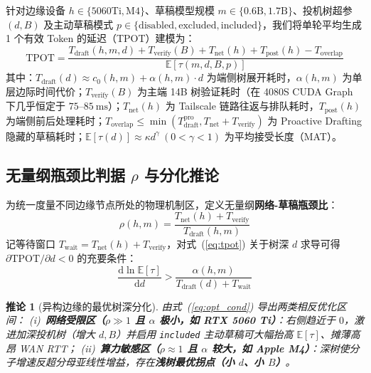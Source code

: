 \documentclass[conference]{IEEEtran}
\newtheorem{proposition}{推论}
\begin{document}
针对边缘设备 $h \in \{\text{5060Ti}, \text{M4}\}$、草稿模型规模 $m \in \{0.6\text{B}, 1.7\text{B}\}$、投机树超参 $(d, B)$ 及主动草稿模式 $p \in \{\text{disabled}, \text{excluded}, \text{included}\}$，我们将单轮平均生成 1 个有效 Token 的延迟（TPOT）建模为：
\begin{equation}
  \mathrm{TPOT} = \frac{T_{\text{draft}}(h,m,d) + T_{\text{verify}}(B) + T_{\text{net}}(h) + T_{\text{post}}(h) - T_{\text{overlap}}}{\mathbb{E}[\tau(m, d, B, p)]}
  \label{eq:tpot}
\end{equation}
其中：$T_{\text{draft}}(d) \approx c_0(h,m) + \alpha(h,m)\cdot d$ 为端侧树展开耗时，$\alpha(h,m)$ 为单层边际时间代价；$T_{\text{verify}}(B)$ 为主端 14B 树验证耗时（在 4080S CUDA Graph 下几乎恒定于 $75\text{--}85\ \text{ms}$）；$T_{\text{net}}(h)$ 为 Tailscale 链路往返与排队耗时，$T_{\text{post}}(h)$ 为端侧前后处理耗时；$T_{\text{overlap}} \le \min(T_{\text{draft}}^{\text{pro}}, T_{\text{net}} + T_{\text{verify}})$ 为 Proactive Drafting 隐藏的草稿耗时；$\mathbb{E}[\tau(d)] \approx \kappa d^{\gamma}\ (0 < \gamma < 1)$ 为平均接受长度（MAT）。

\subsection{无量纲瓶颈比判据 $\rho$ 与分化推论}

为统一度量不同边缘节点所处的物理机制区，定义无量纲\textbf{网络-草稿瓶颈比}：
\begin{equation}
  \rho(h, m) = \frac{T_{\text{net}}(h) + T_{\text{verify}}}{T_{\text{draft}}(h, m)}
  \label{eq:rho}
\end{equation}
记等待窗口 $T_{\text{wait}} = T_{\text{net}}(h) + T_{\text{verify}}$，对式~(\ref{eq:tpot}) 关于树深 $d$ 求导可得 $\partial \mathrm{TPOT} / \partial d < 0$ 的充要条件：
\begin{equation}
  \frac{\mathrm{d}\ln \mathbb{E}[\tau]}{\mathrm{d}d} > \frac{\alpha(h, m)}{T_{\text{draft}}(d) + T_{\text{wait}}}
  \label{eq:opt_cond}
\end{equation}

\begin{proposition}[异构边缘的最优树深分化]
由式~(\ref{eq:opt_cond}) 导出两类相反优化区间：
(i)~\textbf{网络受限区（$\rho \gg 1$ 且 $\alpha$ 极小，如 RTX 5060 Ti）}：右侧趋近于 $0$，激进加深投机树（增大 $d, B$）并启用 \texttt{included} 主动草稿可大幅抬高 $\mathbb{E}[\tau]$、摊薄高昂 WAN RTT；
(ii)~\textbf{算力敏感区（$\rho \approx 1$ 且 $\alpha$ 较大，如 Apple M4）}：深树使分子增速反超分母亚线性增益，存在\textbf{浅树最优拐点（小 $d$、小 $B$）}。
\end{proposition}
\end{document}
